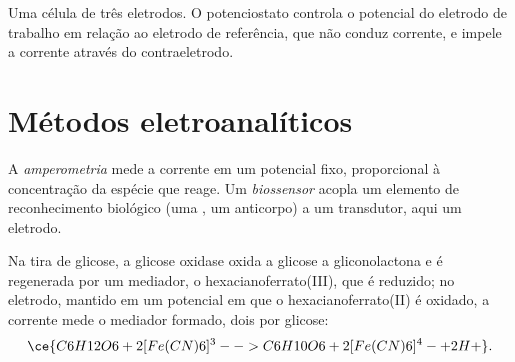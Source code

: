 \begin{omfigure}

{\small Uma célula de três eletrodos. O potenciostato controla o potencial do
eletrodo de trabalho em relação ao eletrodo de referência, que não conduz
corrente, e impele a corrente através do contraeletrodo.}
\end{omfigure}

\section{Métodos eletroanalíticos}

\begin{definition}\label{def:b3:electrode-kinetics:amperometry}
A \emph{amperometria} mede a corrente em um potencial fixo,
proporcional à concentração da espécie que reage. Um
\emph{biossensor} acopla um elemento de reconhecimento biológico
(uma , um anticorpo) a um transdutor, aqui um eletrodo.
\end{definition}

Na tira de glicose, a glicose oxidase oxida a glicose a gliconolactona e é
regenerada por um mediador, o hexacianoferrato(III), que é reduzido; no eletrodo,
mantido em um potencial em que o hexacianoferrato(II) é oxidado, a corrente mede o
mediador formado, dois por glicose:
\[
  \ce{C6H12O6 + 2 [Fe(CN)6]^3- -> C6H10O6 + 2 [Fe(CN)6]^4- + 2 H+} .
\]

